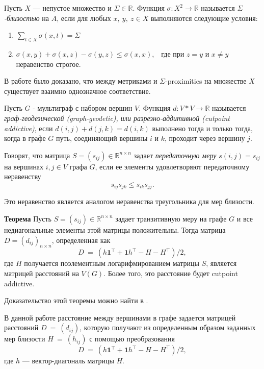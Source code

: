 \begin{definition}
Пусть $X$ --- непустое множество и $\Sigma \in \mathbb{R}$. Функция $\sigma: X^2 \rightarrow \mathbb{R}$ называется $\Sigma$\emph{-близостью} на $A$, если для любых $x,\ y,\ z \in X$ выполняются следующие условия:
\begin{enumerate}
\item $\sum\limits_{t \in X} \sigma (x,t) = \Sigma$
\item $\sigma(x,y) + \sigma(x,z) - \sigma(y,z) \le \sigma(x,x)$,\ \  где при $z = y$ и $x \ne y$ неравенство строгое.
\end{enumerate}
\end{definition}

В работе \cite{chebotarev2013studying} было доказано, что между метриками и $\Sigma$-proximities на множестве $X$ существует взаимно однозначное соответствие.

\begin{definition}
Пусть $G$ - мультиграф с набором вершин $V$. Функция $d: V*V \rightarrow \mathbb{R}$ называется \emph{граф-геодезической (graph-geodetic), или разрезно-аддитивной (cutpoint addictive)}, если $d(i,j)+d(j,k) = d(i,k)$ выполнено тогда и только тогда, когда в графе $G$ путь, соединяющий вершины $i$ и $k$, проходит через вершину $j$.
\end{definition}

\begin{definition}
Говорят, что матрица $S=(s_{ij}) \in \mathbb{R}^{n\times n}$ задает \emph{передаточную меру} $s(i,j) = s_{ij}$ на вершинах $i,j \in V$ графа $G$, если ее элементы удовлетворяют передаточному неравенству $$s_{ij}s_{jk} \le s_{ik}s_{jj}.$$

Это неравенство является аналогом неравенства треугольника для мер близости.
\end{definition}

\textbf{Теорема}
Пусть $S=(s_{ij}) \in \mathbb{R}^{n\times n}$ задает транзитивную меру на графе $G$ и все недиагональные элементы этой матрицы положительны. Тогда матрица $D = (d_{ij})_{n\times n}$, определенная как
$$D~=~(h \textbf{1}^\intercal + \textbf{1} h^\intercal - H - H ^\intercal) /2,$$ 
где $H$ получается поэлементным логарифмированием матрицы $S$, является матрицей расстояний на $V(G)$. Более того, это расстояние будет cutpoint addictive.

Доказательство этой теоремы можно найти в \cite{chebotarev2005duality}.


В данной работе расстояние между вершинами в графе задается матрицей расстояний $D~=~(d_{ij})$, которую получают из определенным образом заданных мер близости $H~=~(h_{ij})$ с помощью преобразования
$$D~=~(h \textbf{1}^\intercal + \textbf{1} h^\intercal - H - H ^\intercal) /2, $$
где $h$ --- вектор-диагональ матрицы $H$.

